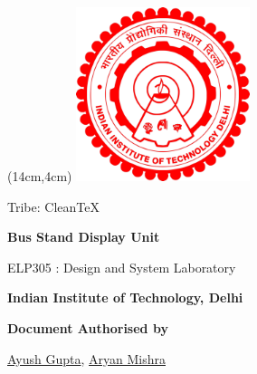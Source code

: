 \renewcommand{\thefootnote}{\alph{footnote}}
\def\mydate{\leavevmode\hbox{\the\year-\twodigits\month-\twodigits\day}}
\def\twodigits#1{\ifnum#1<10 0\fi\the#1}
\begin{titlepage}

       \begin{textblock*}{6cm}(14cm,4cm)
       \includegraphics[width=2in]{Files/Images/iitdlogo.png}
       \end{textblock*}
            \vskip1in
	        \raggedright
            \vskip3in
              {%
				\fontsize{20}{28}
				\boldmath
				\sffamily
				 Tribe: CleanTeX
				\par
            }
             \vskip0.2in
           
             {
				\Large
				\fontsize{28}{32}
				\bfseries
				\boldmath
				\sffamily
                Bus Stand Display Unit
				\par
            }
            \vskip0.1in
             {
				\fontsize{18}{18}
				\sffamily
                
				\par
            }
            \vskip0.1in
             {
				\fontsize{16}{16}
				\sffamily
                ELP305 : Design and System Laboratory
				\par
            }
            \vskip0.1in
             {
				\fontsize{16}{14}
				\sffamily
                \textbf{Indian Institute of Technology, Delhi}
                \par
            }
    \vspace{0.2in}
    {
        \normalsize
        \sffamily
        \textbf{\textcolor{tuberlindarkgray}{Document Authorised by}}\par \vspace{0.12cm}
        {\href{https://www.linkedin.com/in/ayush-gupta-undergraduate/}{Ayush Gupta}, \href{http://linkedin.com/in/aryan-mishra-04j}{Aryan Mishra}}

}
\end{titlepage}
